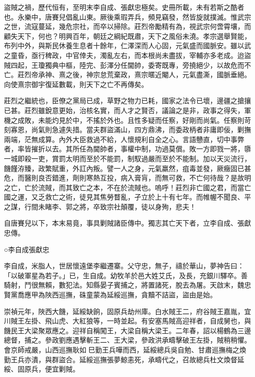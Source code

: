 
\begin{pinyinscope}
盜賊之禍，歷代恒有，至明末李自成、張獻忠極矣。史冊所載，未有若斯之酷者也。永樂中，唐賽兒倡亂山東。厥後乘瑕弄兵，頻見竊發，然皆旋就撲滅。惟武宗之世，流寇蔓延，幾危宗社，而卒以掃除。莊烈帝勵精有為，視武宗何啻霄壤，而顧失天下，何也？明興百年，朝廷之綱紀既肅，天下之風俗未澆。孝宗選舉賢能，布列中外，與斯民休養生息者十餘年，仁澤深而人心固，元氣盛而國脈安。雖以武之童昏，亟行稗政，中官倖夫，濁亂左右，而本根尚未盡拔，宰輔亦多老成。迨盜賊四起，王瓊獨典中樞，陸完、彭澤分任閫帥，委寄既專，旁撓絕少，以故危而不亡。莊烈帝承神、熹之後，神宗怠荒棄政，熹宗暱近閹人，元氣盡澌，國脈垂絕。向使熹宗御宇復延數載，則天下之亡不再傳矣。

莊烈之繼統也，臣僚之黨局已成，草野之物力已耗，國家之法令已壞，邊疆之搶攘已甚。莊烈雖銳意更始，治核名實，而人才之賢否，議論之是非，政事之得失，軍機之成敗，未能灼見於中，不搖於外也。且性多疑而任察，好剛而尚氣。任察則苛刻寡恩，尚氣則急遽失措。當夫群盜滿山，四方鼎沸，而委政柄者非庸即佞，剿撫兩端，茫無成算。內外大臣救過不給，人懷規利自全之心。言語戇直，切中事弊者，率皆摧折以去。其所任為閫帥者，事權中制，功過莫償。敗一方即戮一將，隳一城即殺一吏，賞罰太明而至於不能罰，制馭過嚴而至於不能制。加以天災流行，饑饉洊臻，政繁賦重，外訌內叛。譬一人之身，元氣羸然，疽毒並發，厥癥固已甚危，而醫則良否錯進，劑則寒熱互投，病入膏肓，而無可救，不亡何待哉？是故明之亡，亡於流賊，而其致亡之本，不在於流賊也。嗚呼！莊烈非亡國之君，而當亡國之運，又乏救亡之術，徒見其焦勞瞀亂，孑立於上十有七年。而帷幄不聞良、平之謀，行間未睹李、郭之將，卒致宗社顛覆，徒以身殉，悲夫！

自唐賽兒以下，本末易竟，事具剿賊諸臣傳中。獨志其亡天下者，立李自成、張獻忠傳。

○李自成張獻忠

李自成，米脂人，世居懷遠堡李繼遷寨。父守忠，無子，禱於華山，夢神告曰：「以破軍星為若子。」已，生自成。幼牧羊於邑大姓艾氏，及長，充銀川驛卒。善騎射，鬥很無賴，數犯法。知縣晏子賓捕之，將置諸死，脫去為屠。天啟末，魏忠賢黨喬應甲為陜西巡撫，硃童蒙為延綏巡撫，貪黷不詰盜，盜由是始。

崇禎元年，陜西大饑，延綏缺餉，固原兵劫州庫。白水賊王二，府谷賊王嘉胤，宜川賊王左掛、飛山虎、大紅狼等，一時並起。有安塞馬賊高迎祥者，自成舅也，與饑民王大梁聚眾應之。迎祥自稱闖王，大梁自稱大梁王。二年春，詔以楊鶴為三邊總督，捕之。參政劉應遇擊斬王二、王大梁，參政洪承疇擊破王左掛，賊稍稍懼。會京師戒嚴，山西巡撫耿如巳勤王兵嘩而西，延綏總兵吳自勉、甘肅巡撫梅之煥勤王兵亦潰，與群盜合。延綏巡撫張夢鯨恚死，承疇代之，召故總兵杜文煥督延綏、固原兵，便宜剿賊。


\end{pinyinscope}
